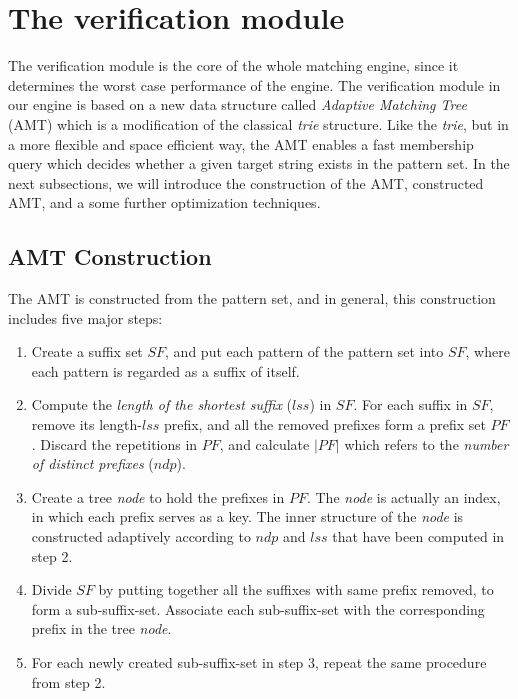 \documentclass{article}
\begin{document}

\section{The verification module}
\label{sec:verification}

The verification module is the core of the whole matching engine,
since it determines the worst case performance of the engine. The
verification module in our engine is based on a new data structure
called \emph{Adaptive Matching Tree} (AMT) which is a modification of
the classical \emph{trie} structure. Like the \emph{trie}, but in a
more flexible and space efficient way, the AMT enables a fast
membership query which decides whether a given target string exists in
the pattern set. In the next subsections, we will introduce the
construction of the AMT, constructed AMT, and a some further
optimization techniques.

\subsection{AMT Construction}
\label{subsec:amt}

The AMT is constructed from the pattern set, and in general, this
construction includes five major steps:

\begin{enumerate}
\item Create a suffix set $SF$, and put each pattern of the pattern
  set into $SF$, where each pattern is regarded as a suffix of itself.
\item Compute the \emph{length of the shortest suffix} ($lss$) in
  $SF$. For each suffix in $SF$, remove its length-$lss$ prefix, and
  all the removed prefixes form a prefix set $PF$. Discard the
  repetitions in $PF$, and calculate $|PF|$ which refers to the
  \emph{number of distinct prefixes} ($ndp$).
\item Create a tree \emph{node} to hold the prefixes in $PF$. The
  \emph{node} is actually an index, in which each prefix serves as a
  key. The inner structure of the \emph{node} is constructed
  adaptively according to $ndp$ and $lss$ that have been computed in
  step 2.
\item Divide $SF$ by putting together all the suffixes with same
  prefix removed, to form a sub-suffix-set. Associate each
  sub-suffix-set with the corresponding prefix in the tree
  \emph{node}.
\item For each newly created sub-suffix-set in step 3, repeat the same
  procedure from step 2.
\end{enumerate}
\end{document}
